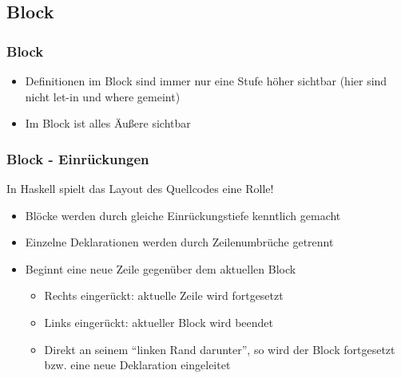 \subsection{Block}
\begin{frame}
\frametitle{Block}
\begin{block}{\vspace*{-3ex}}
\begin{itemize}
  \item Definitionen im Block sind immer nur eine Stufe höher sichtbar (hier sind nicht let-in und where gemeint)
  \item Im Block ist alles Äußere sichtbar
\end{itemize}
\end{block}
\end{frame}

\begin{frame}
\frametitle{Block - Einrückungen}
\begin{block}{\vspace*{-3ex}}
In Haskell spielt das Layout des Quellcodes eine Rolle!
\begin{itemize}
  \item Blöcke werden durch gleiche Einrückungstiefe kenntlich gemacht
  \item Einzelne Deklarationen werden durch Zeilenumbrüche getrennt
  \item Beginnt eine neue Zeile gegenüber dem aktuellen Block \\
  \begin{itemize}
    \item Rechts eingerückt: aktuelle Zeile wird fortgesetzt
    \item Links eingerückt: aktueller Block wird beendet
    \item Direkt an seinem "`linken Rand darunter"', so wird der Block fortgesetzt bzw. eine neue Deklaration eingeleitet 
  \end{itemize}
\end{itemize}
\end{block}
\end{frame}

